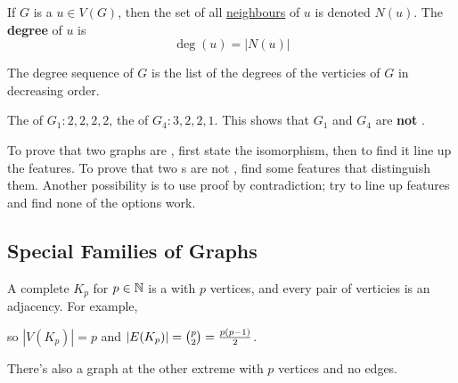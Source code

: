\documentclass[english, 11pt]{article}
\begin{document}
\begin{defn}[degree]\label{degree}
If $G$ is a  $u \in V(G)$, then the set of all \hyperref[terminology]{neighbours} of $u$ is denoted $N(u)$. The \textbf{degree} of $u$ is
\[ \deg(u) = |N(u)| \]
\end{defn}
\begin{defn}\label{degree sequence}
The degree sequence of $G$ is the list of the degrees of the verticies of $G$ in decreasing order.
\end{defn}
\begin{exmp}
  The  of $G_1 : 2,2,2,2$, the  of $G_4 : 3,2,2,1$. This shows that $G_1$ and $G_4$ are \textbf{not} .
\end{exmp}
To prove that two graphs are , first state the isomorphism, then to find it line up the features. To prove that two s are not , find some features that distinguish them. Another possibility is to use proof by contradiction; try to line up features and find none of the options work.

\subsection{Special Families of Graphs}

\begin{defn}\label{complete graph}
A complete  $K_p$ for $p \in {\mathbb{N}}$ is a  with $p$ vertices, and every pair of verticies is an adjacency. For example,
  \begin{center}
\end{center}
so $|V(K_p)| = p$ and $|E(K_p)| = {p \choose 2} = \frac{p(p-1)}{2}$.
\end{defn}
There's also a graph at the other extreme with $p$ vertices and no edges.
  \begin{center}
\end{center}
\end{document}
